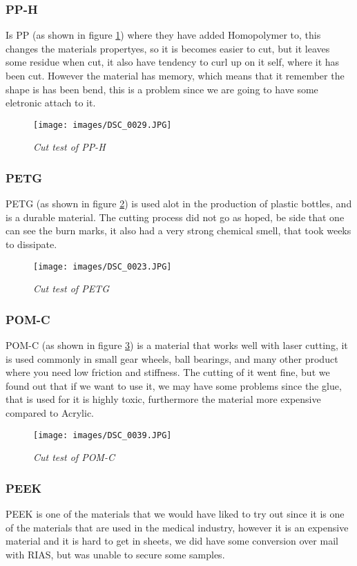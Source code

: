 \subsubsection{PP-H}
Is PP (as shown in figure \ref{fig:PP-H}) where they have added Homopolymer to, this changes the materials propertyes, so it is becomes easier to cut, but it leaves some residue when cut, it also have tendency to curl up on it self, where it has been cut.
However the material has memory, which means that it remember the shape is has been bend, this is a problem since we are going to have some eletronic attach to it.
\begin{figure}[!h]
	\centering
	\texttt{[image: images/DSC\_0029.JPG]}
	\caption{\small {\it {Cut test of PP-H}}} \label{fig:PP-H}
\end{figure}
\FloatBarrier
\subsubsection{PETG}
PETG (as shown in figure \ref{fig:PETG}) is used alot in the production of plastic bottles, and is a durable material.
The cutting process did not go as hoped, be side that one can see the burn marks, it also had a very strong chemical smell, that took weeks to dissipate.
\begin{figure}[!h]
	\centering
	\texttt{[image: images/DSC\_0023.JPG]}
	\caption{\small {\it {Cut test of PETG}}} \label{fig:PETG}
\end{figure}
\FloatBarrier
\subsubsection{POM-C} 
POM-C (as shown in figure \ref{fig:POM-C})  is a material that works well with laser cutting, it is used commonly in small gear wheels, ball bearings, and many other product where you need low friction and stiffness.
The cutting of it went fine, but we found out that if we want to use it, we may have some problems since the glue, that is used for it is highly toxic, furthermore the material more expensive compared to Acrylic.
\begin{figure}[!h]
	\centering
	\texttt{[image: images/DSC\_0039.JPG]}
	\caption{\small {\it {Cut test of POM-C}}} \label{fig:POM-C}
\end{figure}
\FloatBarrier

\subsubsection{PEEK}
PEEK is one of the materials that we would have liked to try out since it is one of the materials that are used in the medical industry, however it is an expensive material and it is hard to get in sheets, we did have some conversion over mail with RIAS, but was unable to secure some samples.

